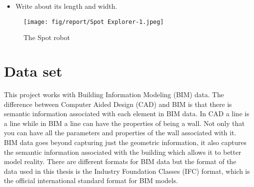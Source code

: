 \begin{itemize}
    \item Write about its length and width.
\end{itemize}

\begin{figure}[H]
    \centering
    \texttt{[image: fig/report/Spot Explorer-1.jpeg]}
    \label{}
    \caption[The SPOT robot]{The Spot robot\textbf{}~\cite{spot}}
\end{figure}



\section{Data set}\label{dataset}
This project works with Building Information Modeling (BIM) data. 
The difference between Computer Aided Design (CAD) and BIM is that there is semantic information associated with each element in BIM data. In CAD a line is a line while in BIM a line can have the properties of being a wall. Not only that you can have all the parameters and properties of the wall associated with it.
\cite{bim_vs_cad}
BIM data goes beyond capturing just the geometric information, it also captures the semantic information associated with the building which allows it to better model reality. %
There are different formats for BIM data but the format of the data used in this thesis is the Industry Foundation Classes (IFC) format, which is the official international standard format for BIM models. 



